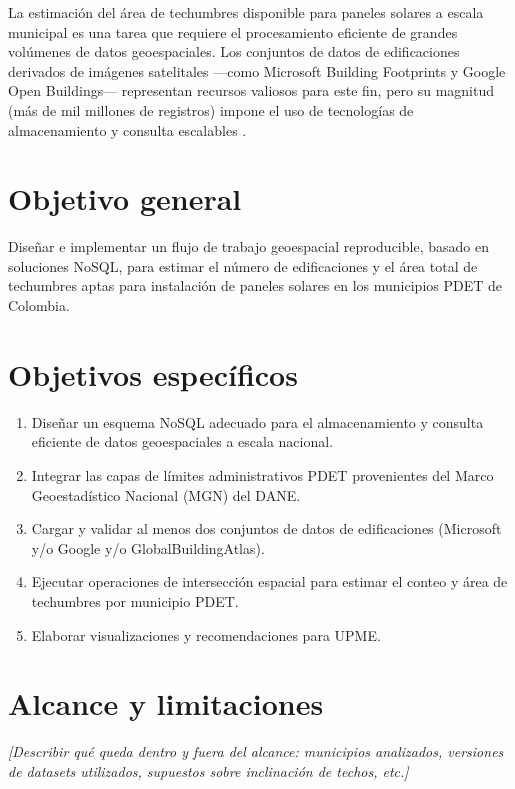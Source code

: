 \documentclass[12pt, a4paper]{report}
\begin{document}
La estimación del área de techumbres disponible para paneles solares a escala
municipal es una tarea que requiere el procesamiento eficiente de grandes
volúmenes de datos geoespaciales. Los conjuntos de datos de edificaciones
derivados de imágenes satelitales —como Microsoft Building Footprints y
Google Open Buildings— representan recursos valiosos para este fin, pero
su magnitud (más de mil millones de registros) impone el uso de tecnologías
de almacenamiento y consulta escalables \parencite{microsoft2023buildings,
sirko2021continental}.

\section{Objetivo general}

Diseñar e implementar un flujo de trabajo geoespacial reproducible, basado
en soluciones NoSQL, para estimar el número de edificaciones y el área total
de techumbres aptas para instalación de paneles solares en los municipios
PDET de Colombia.

\section{Objetivos específicos}

\begin{enumerate}[label=\arabic*.]
  \item Diseñar un esquema NoSQL adecuado para el almacenamiento y consulta
        eficiente de datos geoespaciales a escala nacional.
  \item Integrar las capas de límites administrativos PDET provenientes del
        Marco Geoestadístico Nacional (MGN) del DANE.
  \item Cargar y validar al menos dos conjuntos de datos de edificaciones
        (Microsoft y/o Google y/o GlobalBuildingAtlas).
  \item Ejecutar operaciones de intersección espacial para estimar el conteo
        y área de techumbres por municipio PDET.
  \item Elaborar visualizaciones y recomendaciones para UPME.
\end{enumerate}

\section{Alcance y limitaciones}

\textit{[Describir qué queda dentro y fuera del alcance: municipios analizados,
versiones de datasets utilizados, supuestos sobre inclinación de techos, etc.]}
\end{document}
